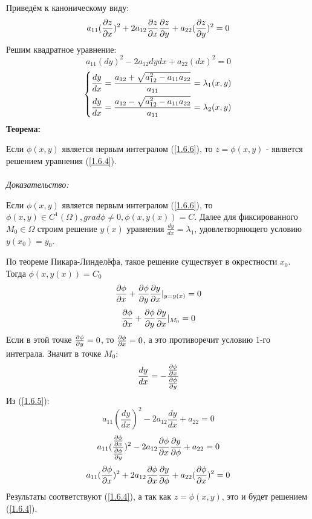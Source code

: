 \documentclass[../main.tex]{subfiles}
\begin{document}
Приведём к каноническому виду:
\begin{equation}\label{1.6.4}
    a_{11}(\frac{\partial z}{\partial x})^2+2a_{12}\frac{\partial z}{\partial x}\frac{\partial z}{\partial y}+a_{22}(\frac{\partial z}{\partial y})^2=0
\end{equation}
Решим квадратное уравнение:
\begin{equation}\label{1.6.5}
    a_{11}(dy)^2-2a_{12}dydx+a_{22}(dx)^2=0
    \end{equation}
\begin{equation}\label{1.6.6}
    \begin{dcases}
    \frac{dy}{dx} = \frac{a_{12}+\sqrt{a_{12}^2-a_{11}a_{22}}}{a_{11}}=\lambda_1(x,y) \\
    \frac{dy}{dx} = \frac{a_{12}-\sqrt{a_{12}^2-a_{11}a_{22}}}{a_{11}}=\lambda_2(x,y)
    \end{dcases}
\end{equation}
\textbf{Теорема:}\\
\par Если $\phi(x,y)$ является первым интегралом (\ref{1.6.6}), то $z=\phi(x,y)$ - является решением уравнения (\ref{1.6.4}). \\ \\
\textit{Доказательство:}\\
\par Если $\phi(x,y)$ является первым интегралом (\ref{1.6.6}), то $\phi(x,y) \in C^1(\Omega), grad\phi \ne 0, \phi(x,y(x))=C$. Далее для фиксированного $M_0\in\Omega$ строим решение $y(x)$ уравнения $\frac{dy}{dx}=\lambda_1$, удовлетворяющего условию $y(x_0)=y_0$.\\
\par По теореме Пикара-Линделёфа, такое решение существует в окрестности $x_0$. Тогда $\phi(x,y(x))=C_0$
$$\frac{\partial \phi}{\partial x}+\frac{\partial \phi}{\partial y}\frac{\partial y}{\partial x}|_{y=y(x)}=0$$
$$\frac{\partial \phi}{\partial x}+\frac{\partial \phi}{\partial y}\frac{\partial y}{\partial x}|_{M_0}=0$$
Если в этой точке $\frac{\partial \phi}{\partial y}=0$, то $\frac{\partial \phi}{\partial x}=0$, а это противоречит условию 1-го интеграла. Значит в точке $M_0$:
$$\frac{dy}{dx}=-\frac{\frac{\partial \phi}{\partial x}}{\frac{\partial \phi}{\partial y}}$$
Из (\ref{1.6.5}):
$$ a_{11}(\frac{dy}{dx})^2-2a_{12}\frac{dy}{dx}+a_{22}=0$$
$$ a_{11}(\frac{\frac{\partial \phi}{\partial x}}{\frac{\partial \phi}{\partial y}})^2-2a_{12}\frac{\partial \phi}{\partial x}\frac{\partial y}{\partial \phi}+a_{22}=0$$
$$ a_{11}(\frac{\partial \phi}{\partial x})^2+2a_{12}\frac{\partial \phi}{\partial x}\frac{\partial y}{\partial \phi}+a_{22}(\frac{\partial \phi}{\partial x})^2=0$$
Результаты соответствуют (\ref{1.6.4}), а так как $z = \phi(x,y)$, это и будет решением (\ref{1.6.4}).
\end{document}
